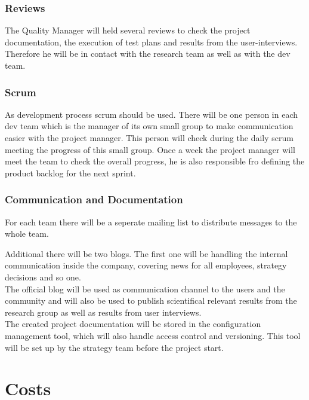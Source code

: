 \documentclass[a4paper,11pt]{article}
\begin{document}
\subsubsection{Reviews}
The Quality Manager will held several reviews to check the project documentation, the execution of test plans and results from the user-interviews. Therefore he will be in contact with the research team as well as with the dev team.

\subsubsection{Scrum}
As development process scrum should be used. There will be one person in each dev team which is the manager of its own small group to make communication easier with the project manager. This person will check during the daily scrum meeting the progress of this small group. Once a week the project manager will meet the team to check the overall progress, he is also responsible fro defining the product backlog for the next sprint.

\subsubsection{Communication and Documentation}
For each team there will be a seperate mailing list to distribute messages to the whole team.

Additional there will be two blogs. The first one will be handling the internal communication inside the company, covering news for all employees, strategy decisions and so one. \\

The official blog will be used as communication channel to the users and the community and will also be used to publish scientifical relevant results from the research group as well as results from user interviews. \\

The created project documentation will be stored in the configuration management tool, which will also handle access control and versioning. This tool will be set up by the strategy team before the project start.


\pagebreak

\section{Costs}
\label{sect:costs}
\end{document}
